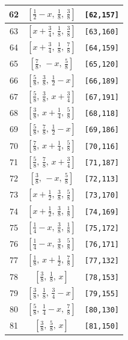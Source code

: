 \documentclass[fleqn,8pt]{jsarticle}
\begin{document}
\begin{longtable}{ccc}
62 & $\left[ \frac{1}{2} - x,\, \frac{1}{8},\, \frac{3}{8} \right]$ & {\tt [62,157]} \\ \hline
63 & $\left[ x + \frac{3}{4},\, \frac{1}{8},\, \frac{3}{8} \right]$ & {\tt [63,160]} \\ \hline
64 & $\left[ x + \frac{3}{4},\, \frac{1}{8},\, \frac{7}{8} \right]$ & {\tt [64,159]} \\ \hline
65 & $\left[ \frac{7}{8},\, - x,\, \frac{5}{8} \right]$ & {\tt [65,120]} \\ \hline
66 & $\left[ \frac{5}{8},\, \frac{3}{8},\, \frac{1}{2} - x \right]$ & {\tt [66,189]} \\ \hline
67 & $\left[ \frac{5}{8},\, \frac{3}{8},\, x + \frac{3}{4} \right]$ & {\tt [67,191]} \\ \hline
68 & $\left[ \frac{3}{8},\, x + \frac{1}{4},\, \frac{5}{8} \right]$ & {\tt [68,118]} \\ \hline
69 & $\left[ \frac{5}{8},\, \frac{7}{8},\, \frac{1}{2} - x \right]$ & {\tt [69,186]} \\ \hline
70 & $\left[ \frac{7}{8},\, x + \frac{1}{4},\, \frac{5}{8} \right]$ & {\tt [70,116]} \\ \hline
71 & $\left[ \frac{5}{8},\, \frac{7}{8},\, x + \frac{3}{4} \right]$ & {\tt [71,187]} \\ \hline
72 & $\left[ \frac{3}{8},\, - x,\, \frac{5}{8} \right]$ & {\tt [72,113]} \\ \hline
73 & $\left[ x + \frac{1}{2},\, \frac{3}{8},\, \frac{5}{8} \right]$ & {\tt [73,170]} \\ \hline
74 & $\left[ x + \frac{1}{2},\, \frac{3}{8},\, \frac{1}{8} \right]$ & {\tt [74,169]} \\ \hline
75 & $\left[ \frac{1}{4} - x,\, \frac{3}{8},\, \frac{1}{8} \right]$ & {\tt [75,172]} \\ \hline
76 & $\left[ \frac{1}{4} - x,\, \frac{3}{8},\, \frac{5}{8} \right]$ & {\tt [76,171]} \\ \hline
77 & $\left[ \frac{1}{8},\, x + \frac{1}{2},\, \frac{7}{8} \right]$ & {\tt [77,132]} \\ \hline
78 & $\left[ \frac{3}{8},\, \frac{1}{8},\, x \right]$ & {\tt [78,153]} \\ \hline
79 & $\left[ \frac{3}{8},\, \frac{1}{8},\, \frac{3}{4} - x \right]$ & {\tt [79,155]} \\ \hline
80 & $\left[ \frac{5}{8},\, \frac{1}{4} - x,\, \frac{7}{8} \right]$ & {\tt [80,130]} \\ \hline
81 & $\left[ \frac{3}{8},\, \frac{5}{8},\, x \right]$ & {\tt [81,150]} \\ \hline

\end{longtable}
\end{document}
